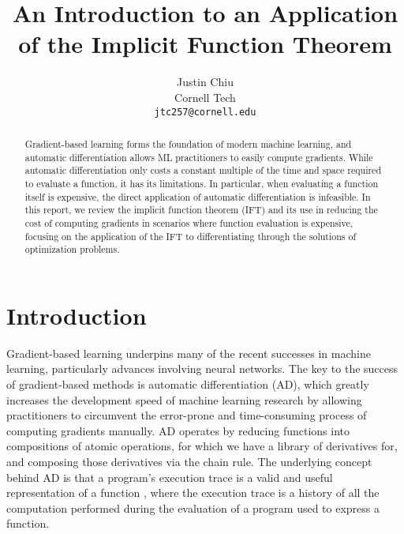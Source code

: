 \documentclass[11pt]{article}
\title{An Introduction to an Application of the Implicit Function Theorem}
\author{Justin Chiu \\
  Cornell Tech \\
  \texttt{jtc257@cornell.edu}}
\begin{document}
\maketitle
\begin{abstract}
Gradient-based learning forms the foundation of modern machine learning,
and automatic differentiation allows ML practitioners to easily compute gradients.
While automatic differentiation only costs a constant multiple of the time and space
required to evaluate a function, it has its limitations.
In particular, when evaluating a function itself is expensive,
the direct application of automatic differentiation is infeasible.
In this report, we review the implicit function theorem (IFT)
and its use in reducing the cost of computing gradients in scenarios where
function evaluation is expensive,
focusing on the application of the IFT to differentiating
through the solutions of optimization problems.
\end{abstract}

\section{Introduction}
\label{sec:intro}
Gradient-based learning underpins many of the recent successes in machine learning,
particularly advances involving neural networks.
The key to the success of gradient-based methods is automatic differentiation (AD),
which greatly increases the development speed of machine learning research by
allowing practitioners to circumvent the error-prone and time-consuming process
of computing gradients manually.
AD operates by reducing functions into compositions of atomic operations,
for which we have a library of derivatives for,
and composing those derivatives via the chain rule.
The underlying concept behind AD is that a program's execution trace is a valid
and useful representation of a function \citep{griewank2008autodiff},
where the execution trace is a history of all the computation performed
during the evaluation of a program used to express a function.
\end{document}
